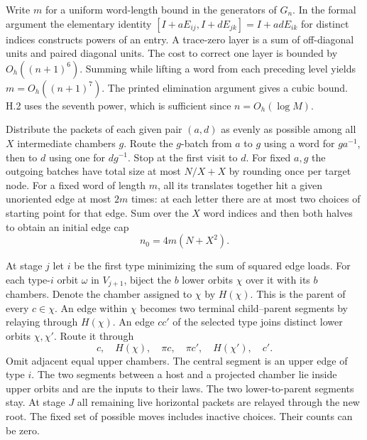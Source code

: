 
\newpage
{}
Write $m$ for a uniform word-length bound in the generators of $G_n$. In the formal argument the elementary identity $[I+aE_{ij},I+dE_{jk}]=I+adE_{ik}$ for distinct indices constructs powers of an entry. A trace-zero layer is a sum of off-diagonal units and paired diagonal units. The cost to correct one layer is bounded by $O_h((n+1)^6)$. Summing while lifting a word from each preceding level yields $m=O_h((n+1)^7)$. The printed elimination argument gives a cubic bound. H.2 uses the seventh power, which is sufficient since $n=O_h(\log M)$.

Distribute the packets of each given pair $(a,d)$ as evenly as possible among all $X$ intermediate chambers $g$. Route the $g$-batch from $a$ to $g$ using a word for $ga^{-1}$, then to $d$ using one for $dg^{-1}$. Stop at the first visit to $d$. For fixed $a,g$ the outgoing batches have total size at most $N/X+X$ by rounding once per target node. For a fixed word of length $m$, all its translates together hit a given unoriented edge at most $2m$ times: at each letter there are at most two choices of starting point for that edge. Sum over the $X$ word indices and then both halves to obtain an initial edge cap
\[
                         n_0=4m(N+X^2).
\]

At stage $j$ let $i$ be the first type minimizing the sum of squared edge loads. For each type-$i$ orbit $\omega$ in $V_{j+1}$, biject the $b$ lower orbits $\chi$ over it with its $b$ chambers. Denote the chamber assigned to $\chi$ by $H(\chi)$. This is the parent of every $c\in\chi$. An edge within $\chi$ becomes two terminal child--parent segments by relaying through $H(\chi)$. An edge $cc'$ of the selected type joins distinct lower orbits $\chi,\chi'$. Route it through
\[
 c,\quad H(\chi),\quad \pi c,\quad \pi c',\quad H(\chi'),\quad c'.
\]
Omit adjacent equal upper chambers. The central segment is an upper edge of type $i$. The two segments between a host and a projected chamber lie inside upper orbits and are the inputs to their laws. The two lower-to-parent segments stay. At stage $J$ all remaining live horizontal packets are relayed through the new root. The fixed set of possible moves includes inactive choices. Their counts can be zero.

